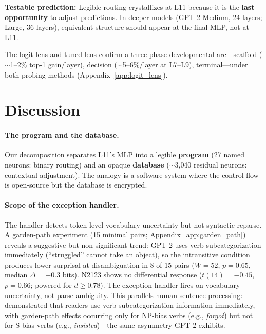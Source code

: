 \documentclass{article}
\begin{document}
\textbf{Testable prediction:} Legible routing crystallizes at L11 because it is
the \textbf{last opportunity} to adjust predictions.
In deeper models (GPT-2 Medium, 24 layers; Large, 36 layers), equivalent
structure should appear at the final MLP, not at L11.

The logit lens and tuned lens \citep{belrose2023eliciting} confirm a three-phase
developmental arc---scaffold ($\sim$1--2\% top-1 gain/layer), decision
($\sim$5--6\%/layer at L7--L9), terminal---under both probing methods
(Appendix~\ref{app:logit_lens}).

\section{Discussion}
\label{sec:discussion}

\paragraph{The program and the database.}
Our decomposition separates L11's MLP into a legible \textbf{program} (27 named
neurons: binary routing) and an opaque \textbf{database} ($\sim$3{,}040 residual
neurons: contextual adjustment).
The analogy is a software system where the control flow is open-source but the
database is encrypted.

\paragraph{Scope of the exception handler.}
\label{sec:garden_path}
The handler detects token-level vocabulary uncertainty but not syntactic reparse.
A garden-path experiment (15 minimal pairs; Appendix~\ref{app:garden_path})
reveals a suggestive but non-significant trend: GPT-2 uses verb
subcategorization immediately (``struggled'' cannot take an object), so
the intransitive condition produces lower surprisal at disambiguation
in 8 of 15 pairs ($W = 52$, $p = 0.65$, median $\Delta = +0.3$ bits).
N2123 shows no differential response ($t(14) = -0.45$, $p = 0.66$;
powered for $d \geq 0.78$).
The exception handler fires on vocabulary uncertainty, not parse ambiguity.
This parallels human sentence processing: \citet{trueswell1993verb} demonstrated
that readers use verb subcategorization information immediately, with
garden-path effects occurring only for NP-bias verbs (e.g., \emph{forgot})
but not for S-bias verbs (e.g., \emph{insisted})---the same asymmetry GPT-2
exhibits.
\end{document}
